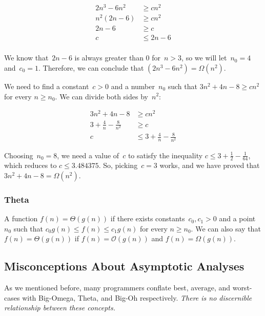 \begin{align*}
  2n^3 - 6n^2 &\geq cn^2\\
  n^2(2n - 6) &\geq cn^2\\
  2n - 6 &\geq c\\
  c &\leq 2n - 6\\
\end{align*}

We know that~$2n - 6$ is always greater than $0$ for~$n > 3$, so we will let~$n_0 = 4$ and~$c_0 = 1$. 
Therefore, we can conclude that $(2n^3 - 6n^2) = \Omega(n^2)$.

We need to find a constant~$c > 0$ and a number~$n_0$ such that $3n^2 + 4n - 8 \geq cn^2$ for every $n \geq n_0$.
We can divide both sides by~$n^2$:

\begin{align*}
  3n^2 + 4n - 8 &\geq cn^2\\
  3 + \frac{4}{n} - \frac{8}{n^2} &\geq c\\
  c &\leq 3 + \frac{4}{n} - \frac{8}{n^2}
\end{align*}

Choosing~$n_0 = 8$, we need a value of~$c$ to satisfy the inequality $c \leq 3 + \frac{1}{2} - \frac{1}{64}$, which reduces to $c \leq 3.484375$. 
So, picking~$c = 3$ works, and we have proved that $3n^2 + 4n - 8 = \Omega(n^2)$.

\subsubsection*{Theta}
A function $f(n) = \Theta(g(n))$ if there exists constants~$c_0, c_1 > 0$ and a point~$n_0$ such that $c_0g(n) \leq f(n) \leq c_1g(n)$ for every $n \geq n_0$. 
We can also say that $f(n) = \Theta(g(n))$ if $f(n) = \mathcal{O}(g(n))$ and $f(n) = \Omega(g(n))$.

\subsection{Misconceptions About Asymptotic Analyses}

As we mentioned before, many programmers conflate best, average, and worst-cases with Big-Omega, Theta, and Big-Oh respectively. \emph{There is no discernible relationship between these concepts.}


